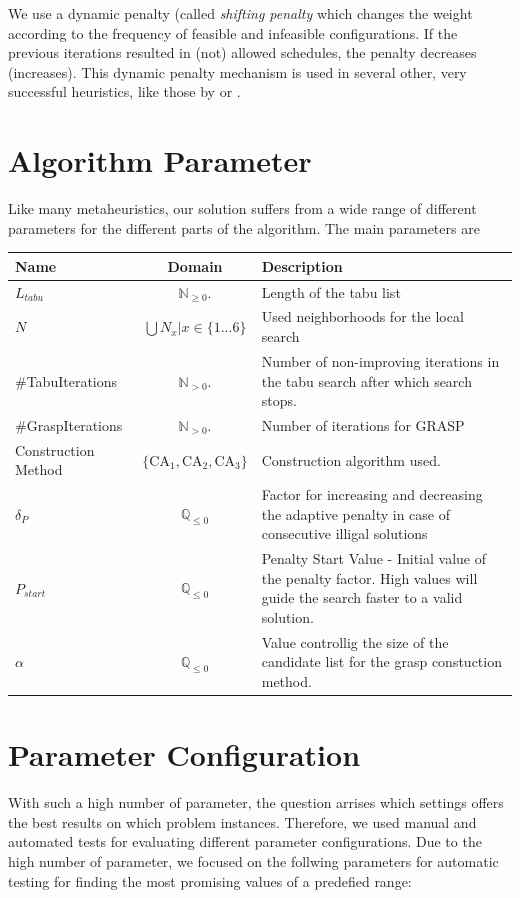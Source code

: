 \documentclass[a4paper,11pt]{article}
\begin{document}
We use a dynamic penalty (called \emph{shifting penalty} which changes the weight according to the frequency of feasible and infeasible configurations.
If the previous iterations resulted in (not) allowed schedules, the penalty decreases (increases).
This dynamic penalty mechanism is used in several other, very successful heuristics, like those by \cite{Anagnostopoulos06} or \cite{Gaspero07}.


\section{Algorithm Parameter}
Like many metaheuristics, our solution suffers from a wide range of different parameters for the different parts of the algorithm.
The main parameters are
\begin{center}

\begin{tabularx}{\linewidth}{| l | c | X | }
  \hline
  Name & Domain & Description \\   \hline     \hline
  $L_{tabu}$ & $\mathbb{N}_{\geq0}.$ & Length of the tabu list \\ \hline
  $N$ & $\bigcup N_x  | x \in \{1...6\}$ & Used neighborhoods for the local search \\ \hline
  \#TabuIterations &  $\mathbb{N}_{ > 0}.$ & Number of non-improving iterations in the tabu search after which search stops. \\ \hline
  \#GraspIterations &  $\mathbb{N}_{> 0}.$ & Number of iterations for \ac{GRASP} \\ \hline
  Construction Method &  $\{\text{CA}_1, \text{CA}_2, \text{CA}_3\}$ & Construction algorithm used.\\ \hline
  $ \delta_P $ &  $\mathbb{Q}_{\leq0}$ & Factor for increasing and decreasing the adaptive penalty in case of consecutive illigal solutions\\ \hline
  $P_{start}$ &  $\mathbb{Q}_{\leq0}$ &Penalty Start Value -  Initial value of the penalty factor. High values will guide the search faster to a valid solution.\\ \hline
  $\alpha$ & $\mathbb{Q}_{\leq0}$ & Value controllig the size of the candidate list for the grasp constuction method. \\ \hline

\end{tabularx}
\end{center}

\section{Parameter Configuration}
With such a high number of parameter, the question arrises which settings offers the best results on which problem instances. Therefore, we used manual and
automated tests for evaluating different parameter configurations.
Due to the high number of parameter, we focused on the follwing parameters for automatic testing for finding the most promising values of a predefied range:
\end{document}
